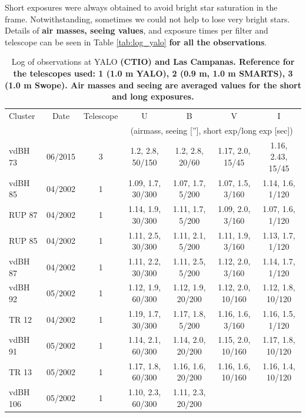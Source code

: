 \documentclass[referee]{aa}
\begin{document}
Short exposures were always obtained to avoid bright star saturation in the
frame. Notwithstanding, sometimes we could not help to lose very bright stars.
Details of \textbf{air masses, seeing values}, and exposure times per filter and
telescope can be seen in Table \ref{tab:log_yalo} \textbf{for all the observations}.


\begin{table}[ht]
    \centering
    \caption{Log of observations at YALO \textbf{(CTIO) and Las Campanas.
    Reference for the telescopes used: 1 (1.0 m YALO), 2 (0.9 m, 1.0 m SMARTS),
    3 (1.0 m Swope). Air masses and seeing are averaged values for the short and
    long exposures.}}
    \begin{tabular}{lcccccc}
    \hline \hline 
        Cluster & Date & Telescope & U & B & V &  I\\
                &      &           &
        \multicolumn{4}{c}{(airmass, seeing [''], short exp/long exp [sec])}\\
       \hline
        vdBH 73   & 06/2015 & 3 & 1.2, 2.8, 50/150 & 1.2, 2.8, 20/60 &
        1.17, 2.0, 15/45  & 1.16, 2.43, 15/45\\
        vdBH 85   & 04/2002 & 1 & 1.09, 1.7, 30/300 & 1.07, 1.7, 5/200 &
        1.07, 1.5, 3/160 & 1.14, 1.6, 1/120\\
        RUP 87    & 04/2002 & 1 & 1.14, 1.9, 30/300 & 1.11, 1.7, 5/200 &
        1.09, 2.0, 3/160 & 1.07, 1.6, 1/120\\
        RUP 85    & 04/2002 & 1 & 1.11, 2.5, 30/300 & 1.11, 2.1, 5/200 &
        1.11, 1.9, 3/160 & 1.13, 1.7, 1/120\\
        vdBH 87   & 04/2002 & 1 & 1.11, 2.2, 30/300 & 1.11, 2.5, 5/200 &
        1.12, 2.0, 3/160 & 1.14, 1.7, 1/120\\
        vdBH 92   & 05/2002 & 1 & 1.12, 1.9, 60/300 & 1.12, 1.9, 20/200 &
        1.12, 2.0, 10/160 & 1.12, 1.8, 10/120\\
        TR 12     & 04/2002 & 1 & 1.19, 1.7, 30/300 & 1.17, 1.8, 5/200 &
        1.16, 1.6, 3/160 & 1.16, 1.5, 1/120\\
        vdBH 91   & 05/2002 & 1 & 1.14, 2.1, 60/300 & 1.14, 2.0, 20/200 &
        1.15, 2.0, 10/160 & 1.17, 1.8, 10/120\\
        TR 13     & 05/2002 & 1 & 1.17, 1.8, 60/300 & 1.16, 1.6, 20/200 &
        1.16, 1.6, 10/160 & 1.16, 1.4, 10/120\\
        vdBH 106  & 05/2002 & 1 & 1.10, 2.3, 60/300 & 1.11, 2.3, 20/200 &

\end{tabular}
\end{table}
\end{document}
